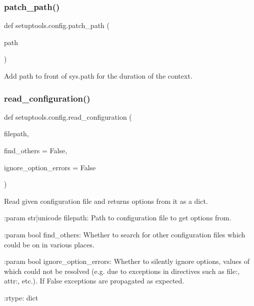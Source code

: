 \subsubsection{\texorpdfstring{patch\+\_\+path()}{patch\_path()}}
{\footnotesize\ttfamily def setuptools.\+config.\+patch\+\_\+path (\begin{DoxyParamCaption}\item[{}]{path }\end{DoxyParamCaption})}

\begin{DoxyVerb}Add path to front of sys.path for the duration of the context.
\end{DoxyVerb}
 \mbox{\label{namespacesetuptools_1_1config_a2cadac39b3e9811ccf02204b63586fc9}} 
\subsubsection{\texorpdfstring{read\+\_\+configuration()}{read\_configuration()}}
{\footnotesize\ttfamily def setuptools.\+config.\+read\+\_\+configuration (\begin{DoxyParamCaption}\item[{}]{filepath,  }\item[{}]{find\+\_\+others = {\ttfamily False},  }\item[{}]{ignore\+\_\+option\+\_\+errors = {\ttfamily False} }\end{DoxyParamCaption})}

\begin{DoxyVerb}Read given configuration file and returns options from it as a dict.

:param str|unicode filepath: Path to configuration file
    to get options from.

:param bool find_others: Whether to search for other configuration files
    which could be on in various places.

:param bool ignore_option_errors: Whether to silently ignore
    options, values of which could not be resolved (e.g. due to exceptions
    in directives such as file:, attr:, etc.).
    If False exceptions are propagated as expected.

:rtype: dict
\end{DoxyVerb}
 